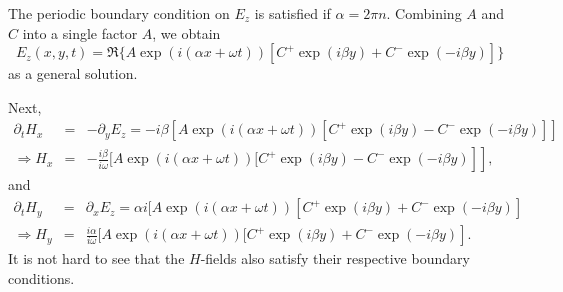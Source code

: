 \documentclass{article}
\newcommand{\nobracket}{}
\newcommand{\um}{-}
\begin{document}
The periodic boundary condition on $E_z$ is satisfied if $\alpha = 2 \pi n$.
Combining $A$ and $C$ into a single factor $A$, we obtain
\[ \nobracket \nobracket E_z (x, y, t) = \Re \{ A \exp (i (\alpha x + \omega
   t)) [C^+ \exp (i \beta y) + C^{\um} \exp (- i \beta y)] \} \]
as a general solution.

Next,
\begin{eqnarray*}
  \partial_t H_x & = & \nobracket \nobracket - \partial_y E_z = - i \beta [A
  \exp (i (\alpha x + \omega t)) [C^+ \exp (i \beta y) - C^{\um} \exp (- i
  \beta y)]]\\
  \Rightarrow H_x & = & \left. \left. - \frac{i \beta}{i \omega} [A \exp (i
  (\alpha x + \omega t)) [C^+ \exp (i \beta y) - C^{\um} \exp (- i \beta y)
  \right] \right],
\end{eqnarray*}
and
\begin{eqnarray*}
  \partial_t H_y & = & \nobracket \partial_x E_z = \alpha i [A \exp (i (\alpha
  x + \omega t)) [C^+ \exp (i \beta y) + C^{\um} \exp (- i \beta y)]\\
  \Rightarrow H_y & = & \left. \frac{i \alpha}{i \omega} [A \exp (i (\alpha x
  + \omega t)) [C^+ \exp (i \beta y) + C^{\um} \exp (- i \beta y) \right] .
\end{eqnarray*}
It is not hard to see that the $H$-fields also satisfy their respective
boundary conditions.
\end{document}
